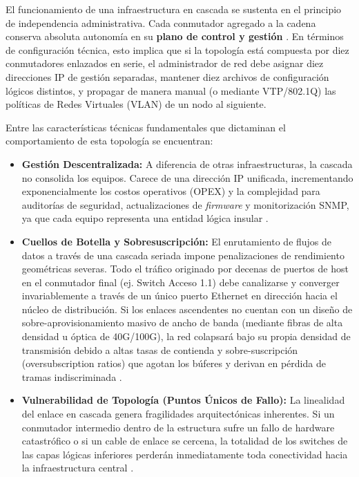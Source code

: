 \documentclass[a4paper,12pt]{article}
\begin{document}
El funcionamiento de una infraestructura en cascada se sustenta en el principio de independencia administrativa. Cada conmutador agregado a la cadena conserva absoluta autonomía en su \textbf{plano de control y gestión} \cite{kurose2017}. En términos de configuración técnica, esto implica que si la topología está compuesta por diez conmutadores enlazados en serie, el administrador de red debe asignar diez direcciones IP de gestión separadas, mantener diez archivos de configuración lógicos distintos, y propagar de manera manual (o mediante VTP/802.1Q) las políticas de Redes Virtuales (VLAN) de un nodo al siguiente.

Entre las características técnicas fundamentales que dictaminan el comportamiento de esta topología se encuentran:

\begin{itemize}
    \item \textbf{Gestión Descentralizada:} A diferencia de otras infraestructuras, la cascada no consolida los equipos. Carece de una dirección IP unificada, incrementando exponencialmente los costos operativos (OPEX) y la complejidad para auditorías de seguridad, actualizaciones de \textit{firmware} y monitorización SNMP, ya que cada equipo representa una entidad lógica insular \cite{stallings2014}.
    \item \textbf{Cuellos de Botella y Sobresuscripción:} El enrutamiento de flujos de datos a través de una cascada seriada impone penalizaciones de rendimiento geométricas severas. Todo el tráfico originado por decenas de puertos de host en el conmutador final (ej. Switch Acceso 1.1) debe canalizarse y converger invariablemente a través de un único puerto Ethernet en dirección hacia el núcleo de distribución. Si los enlaces ascendentes no cuentan con un diseño de sobre-aprovisionamiento masivo de ancho de banda (mediante fibras de alta densidad u óptica de 40G/100G), la red colapsará bajo su propia densidad de transmisión debido a altas tasas de contienda y sobre-suscripción (oversubscription ratios) que agotan los búferes y derivan en pérdida de tramas indiscriminada \cite{tanenbaum2021}.
    \item \textbf{Vulnerabilidad de Topología (Puntos Únicos de Fallo):} La linealidad del enlace en cascada genera fragilidades arquitectónicas inherentes. Si un conmutador intermedio dentro de la estructura sufre un fallo de hardware catastrófico o si un cable de enlace se cercena, la totalidad de los switches de las capas lógicas inferiores perderán inmediatamente toda conectividad hacia la infraestructura central \cite{kurose2017}.

\end{itemize}
\end{document}
